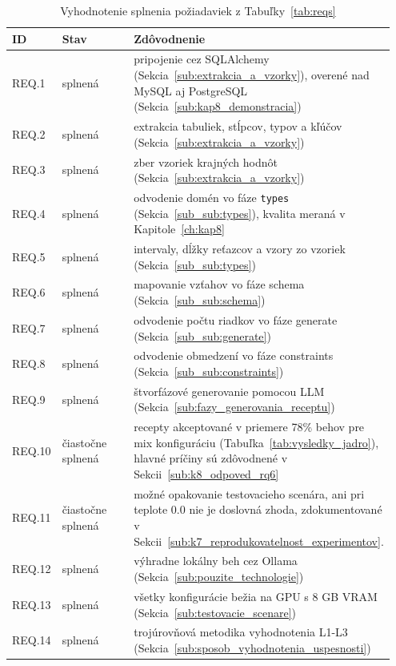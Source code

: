 \begin{table}[H]
    \centering
    \begin{tabular}{>{\raggedright\arraybackslash}p{0.1\linewidth}>{\centering\arraybackslash}p{0.2\linewidth}>{\raggedright\arraybackslash}p{0.65\linewidth}}
    \toprule
    \textbf{ID} & \textbf{Stav} & \textbf{Zdôvodnenie} \\
    \midrule
    REQ.1  & splnená           & pripojenie cez SQLAlchemy (Sekcia~\ref{sub:extrakcia_a_vzorky}), overené nad MySQL aj PostgreSQL (Sekcia~\ref{sub:kap8_demonstracia})\\
    REQ.2  & splnená           & extrakcia tabuliek, stĺpcov, typov a kľúčov (Sekcia~\ref{sub:extrakcia_a_vzorky})\\
    REQ.3  & splnená           & zber vzoriek krajných hodnôt (Sekcia~\ref{sub:extrakcia_a_vzorky})\\
    REQ.4  & splnená           & odvodenie domén vo fáze \texttt{types} (Sekcia~\ref{sub_sub:types}), kvalita meraná v Kapitole~\ref{ch:kap8} \\
    REQ.5  & splnená           & intervaly, dĺžky reťazcov a vzory zo vzoriek (Sekcia~\ref{sub_sub:types})\\
    REQ.6  & splnená           & mapovanie vzťahov vo fáze schema (Sekcia~\ref{sub_sub:schema}) \\
    REQ.7  & splnená           & odvodenie počtu riadkov vo fáze generate (Sekcia~\ref{sub_sub:generate})\\
    REQ.8  & splnená           & odvodenie obmedzení vo fáze constraints (Sekcia~\ref{sub_sub:constraints})\\
    REQ.9  & splnená           & štvorfázové generovanie pomocou LLM (Sekcia~\ref{sub:fazy_generovania_receptu})\\
    REQ.10 & čiastočne splnená & recepty akceptované v priemere 78\% behov pre mix konfiguráciu (Tabuľka~\ref{tab:vysledky_jadro}), hlavné príčiny sú zdôvodnené v Sekcii~\ref{sub:k8_odpoved_rq6}\\
    REQ.11 & čiastočne splnená & možné opakovanie testovacieho scenára, ani pri teplote 0.0 nie je doslovná zhoda, zdokumentované v Sekcii~\ref{sub:k7_reprodukovatelnost_experimentov}.\\
    REQ.12 & splnená           & výhradne lokálny beh cez Ollama (Sekcia~\ref{sub:pouzite_technologie})\\
    REQ.13 & splnená           & všetky konfigurácie bežia na GPU s 8 GB VRAM (Sekcia~\ref{sub:testovacie_scenare})\\
    REQ.14 & splnená           & trojúrovňová metodika vyhodnotenia L1-L3 (Sekcia~\ref{sub:sposob_vyhodnotenia_uspesnosti})\\
    \bottomrule
    \end{tabular}
    \caption{Vyhodnotenie splnenia požiadaviek z Tabuľky~\ref{tab:reqs}}
    \label{tab:rq-vyhod}
\end{table}


